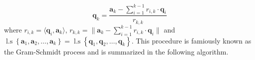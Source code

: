 \begin{equation}\label{eq: comp_orth_basis}
    \bm{q}_k = \frac{\bm{a}_k - \sum_{i=1}^{k-1} r_{i,k} \cdot \bm{q}_i}{r_{k,k}}
\end{equation}
where $r_{i,k} = \langle \bm{q}_i, \bm{a}_k \rangle$, $r_{k,k} = \| \bm{a}_k - \sum_{i=1}^{k-1} r_{i,k} \cdot \bm{q}_i \|$ and $\operatorname{l.s} \left\{ \bm{a}_1, \bm{a}_2, \ldots , \bm{a}_k \right\} = \operatorname{l.s} \left\{ \bm{q}_1, \bm{q}_2, \ldots , \bm{q}_k \right\}$. This procedure is famiously known as the Gram-Schmidt process \cites{BerezanskyMakarovich1996FaV1,TrefethenLloydN.LloydNicholas1997Nla/,DemmelJamesW1997Anla} and is summarized in the following algorithm.




